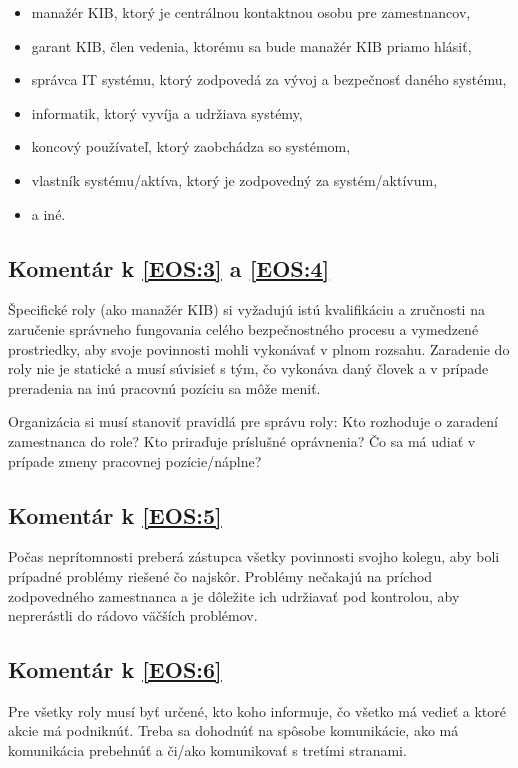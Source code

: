 \begin{itemize}
  \item manažér KIB, ktorý je centrálnou kontaktnou osobu pre zamestnancov,
  \item garant KIB, člen vedenia, ktorému sa bude manažér KIB priamo hlásiť,
  \item správca IT systému, ktorý zodpovedá za vývoj a bezpečnosť daného systému,
  \item informatik, ktorý vyvíja a udržiava systémy,
  \item koncový používateľ, ktorý zaobchádza so systémom,
  \item vlastník systému/aktíva, ktorý je zodpovedný za systém/aktívum,
  \item a iné.
\end{itemize}

\subsection*{Komentár k \ref{EOS:3} a \ref{EOS:4}}
Špecifické roly (ako manažér KIB) si vyžadujú istú kvalifikáciu a zručnosti na zaručenie správneho fungovania celého bezpečnostného
procesu a vymedzené prostriedky, aby svoje povinnosti mohli vykonávať v plnom rozsahu. Zaradenie do roly nie je statické
a musí súvisieť s tým, čo vykonáva daný človek a v prípade preradenia na inú pracovnú pozíciu sa môže meniť.

Organizácia si musí stanoviť pravidlá pre správu roly: Kto rozhoduje o zaradení zamestnanca do role? Kto priraďuje príslušné
oprávnenia? Čo sa má udiať v prípade zmeny pracovnej pozície/náplne?

\subsection*{Komentár k \ref{EOS:5}}
Počas neprítomnosti preberá zástupca všetky povinnosti svojho kolegu, aby boli prípadné problémy riešené čo najskôr. Problémy
nečakajú na príchod zodpovedného zamestnanca a je dôležite ich udržiavať pod kontrolou, aby neprerástli do rádovo väčších
problémov.

\subsection*{Komentár k \ref{EOS:6}}
Pre všetky roly musí byť určené, kto koho informuje, čo všetko má vedieť a ktoré akcie má podniknúť. Treba sa dohodnúť na
spôsobe komunikácie, ako má komunikácia prebehnúť a či/ako komunikovať s tretími stranami.

